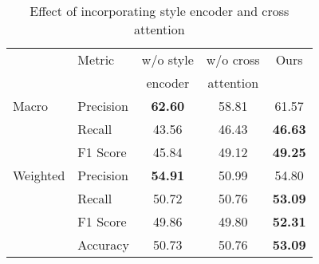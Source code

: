 \begin{table}
    \centering
    \caption{Effect of incorporating style encoder and cross attention}
    \label{tab: deactivation_test}
    \vspace{-0.3cm}
    \begin{tabular}{llccc }
    \hline

         & Metric &w/o style & w/o cross &Ours\\
         & &encoder& attention &\\
        \hline
        Macro & Precision & \textbf{62.60} & 58.81 & 61.57\\
         & Recall &43.56 & 46.43& \textbf{46.63}\\
         & F1 Score &45.84 & 49.12& \textbf{49.25}\\
         \hline
        Weighted & Precision &\textbf{54.91}& 50.99 & 54.80\\
         & Recall &50.72 &50.76 &\textbf{53.09}\\
         & F1 Score & 49.86&49.80 &\textbf{52.31}\\
        \cline{2-5}
          & Accuracy & 50.73&50.76  &\textbf{53.09}\\
        \hline      
    \end{tabular}  
    \vspace{-0.4cm}
\end{table}
